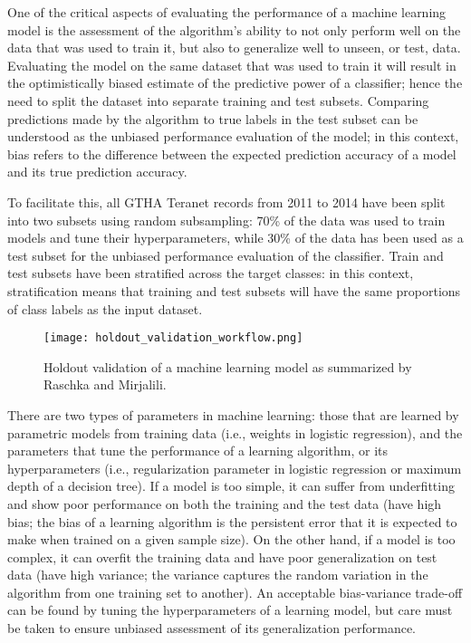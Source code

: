 One of the critical aspects of evaluating the performance of a machine learning model is the assessment of the algorithm's ability to not only perform well on the data that was used to train it, but also to generalize well to unseen, or test, data.
Evaluating the model on the same dataset that was used to train it will result in the optimistically biased estimate of the predictive power of a classifier;
hence the need to split the dataset into separate training and test subsets.
Comparing predictions made by the algorithm to true labels in the test subset can be understood as the unbiased performance evaluation of the model\cite{RaschkaMirjalili2017};
in this context, bias refers to the difference between the expected prediction accuracy of a model and its true prediction accuracy\cite{Raschka2018}.

To facilitate this, all GTHA Teranet records from 2011 to 2014 have been split into two subsets using random subsampling: 70\% of the data was used to train models and tune their hyperparameters, while 30\% of the data has been used as a test subset for the unbiased performance evaluation of the classifier.
Train and test subsets have been stratified across the target classes:
in this context, stratification means that training and test subsets will have the same proportions of class labels as the input dataset.

\begin{figure}[hbt!]
    \centering
    \texttt{[image: holdout\_validation\_workflow.png]}
    \caption{Holdout validation of a machine learning model as summarized by Raschka and Mirjalili\cite{RaschkaMirjalili2017}.}
    \label{fig:holdout_validation_workflow}
\end{figure}

There are two types of parameters in machine learning: those that are learned by parametric models from training data (i.e., weights in logistic regression), and the parameters that tune the performance of a learning algorithm, or its hyperparameters (i.e., regularization parameter in logistic regression or maximum depth of a decision tree).
If a model is too simple, it can suffer from underfitting and show poor performance on both the training and the test data (have high bias;
the bias of a learning algorithm is the persistent error that it is expected to make when trained on a given sample size\cite{Dietterich1995}).
On the other hand, if a model is too complex, it can overfit the training data and have poor generalization on test data (have high variance;
the variance captures the random variation in the algorithm from one training set to another\cite{Dietterich1995}).
An acceptable bias-variance trade-off can be found by tuning the hyperparameters of a learning model, but care must be taken to ensure unbiased assessment of its generalization performance.

